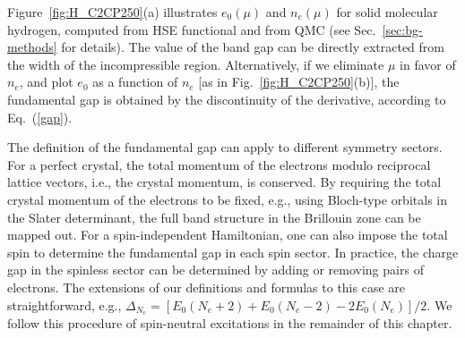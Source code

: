 Figure~\ref{fig:H_C2CP250}(a) illustrates $e_0(\mu)$ and $n_e(\mu)$ for solid molecular hydrogen, computed from HSE functional and from QMC (see Sec.~\ref{sec:bg-methods} for details). The value of the band
gap can be directly extracted from the width of the incompressible region.
Alternatively, if we
eliminate $\mu$ in favor of $n_e$, and plot $e_0$ as a function of $n_e$ [as in Fig.~\ref{fig:H_C2CP250}(b)],
the fundamental gap is obtained by the discontinuity of the derivative, according to 
Eq.~(\ref{gap}).

The definition of the fundamental gap can apply to different symmetry sectors.
For a perfect crystal, the total momentum of the electrons modulo 
reciprocal lattice vectors, i.e., the crystal momentum, is conserved. By requiring the total crystal momentum of the electrons to be fixed,
e.g., using Bloch-type orbitals in the Slater determinant,
the full band structure in the Brillouin zone can be mapped out.
For a spin-independent Hamiltonian, one can also impose the total spin 
to determine the fundamental gap in each spin sector. %
In practice, the charge gap in the spinless sector can
be determined by  adding or removing pairs of electrons. The extensions of our definitions and formulas to this case are straightforward,
e.g., $\Delta_{N_e}=[E_0(N_e+2)+E_0(N_e-2)-2E_0(N_e)]/2$. We follow this procedure of spin-neutral excitations in the remainder of this chapter.

